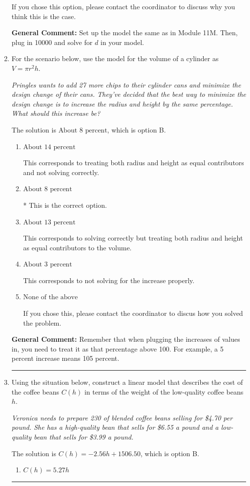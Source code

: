 \documentclass{extbook}[14pt]
\newcommand{\litem}[1]{\item #1

\rule{\textwidth}{0.4pt}}
\begin{document}
\begin{enumerate}
{\begin{enumerate}[label=\Alph*.]
If you chose this option, please contact the coordinator to discuss why you think this is the case.
\end{enumerate}

\textbf{General Comment:} Set up the model the same as in Module 11M. Then, plug in 10000 and solve for $d$ in your model.
}
\litem{
For the scenario below, use the model for the volume of a cylinder as $V = \pi r^2 h$.

\begin{center}
    \textit{ Pringles wants to add 27 \text{percent} more chips to their cylinder cans and minimize the design change of their cans. They've decided that the best way to minimize the design change is to increase the radius and height by the same percentage. What should this increase be? }
\end{center}
The solution is \( \text{About } 8 \text{ percent} \), which is option B.\begin{enumerate}[label=\Alph*.]
\item \( \text{About } 14 \text{ percent} \)

This corresponds to treating both radius and height as equal contributors and not solving correctly.
\item \( \text{About } 8 \text{ percent} \)

* This is the correct option.
\item \( \text{About } 13 \text{ percent} \)

This corresponds to solving correctly but treating both radius and height as equal contributors to the volume.
\item \( \text{About } 3 \text{ percent} \)

This corresponds to not solving for the increase properly.
\item \( \text{None of the above} \)

If you chose this, please contact the coordinator to discus how you solved the problem.
\end{enumerate}

\textbf{General Comment:} Remember that when plugging the increases of values in, you need to treat it as that percentage above 100. For example, a 5 percent increase means 105 percent.
}
\litem{
Using the situation below, construct a linear model that describes the cost of the coffee beans $C(h)$ in terms of the weight of the low-quality coffee beans $h$.

\begin{center}
    \textit{ Veronica needs to prepare 230 of blended coffee beans selling for \$4.70 per pound. She has a high-quality bean that sells for \$6.55 a pound and a low-quality bean that sells for \$3.99 a pound. }
\end{center}
The solution is \( C(h) = -2.56 h + 1506.50 \), which is option B.\begin{enumerate}[label=\Alph*.]
\item \( C(h) = 5.27 h \)


\end{enumerate}}
\end{enumerate}
\end{document}
